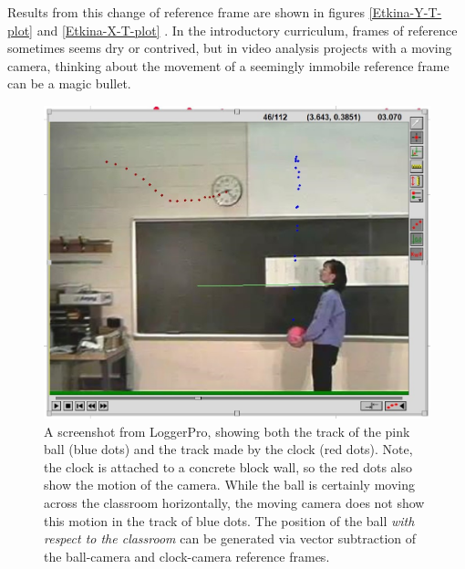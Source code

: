 \documentclass[12pt]{iopart}
\begin{document}
Results from this change of reference frame are shown in figures \ref{Etkina-Y-T-plot} and \ref{Etkina-X-T-plot} . 
In the introductory curriculum, frames of reference sometimes seems dry or contrived, but in video analysis projects with a moving camera, thinking about the movement of a seemingly immobile reference frame can be a magic bullet.

\begin{figure}[h]
\centering
\includegraphics[width=\columnwidth]{figure_3_Etkina-dots-2.jpg}
\caption{
A screenshot from LoggerPro, showing both the track of the pink ball (blue dots) and the track made by the clock (red dots).  Note, the clock is attached to a concrete block wall, so the red dots also show the motion of the camera.  
While the ball is certainly moving across the classroom horizontally, the moving camera does not show this motion in the track of blue dots.
The position of the ball \textit{with respect to the classroom} can be generated via vector subtraction of the ball-camera and clock-camera reference frames.
}
\label{Etkina-dots-2}
\end{figure}
\end{document}
